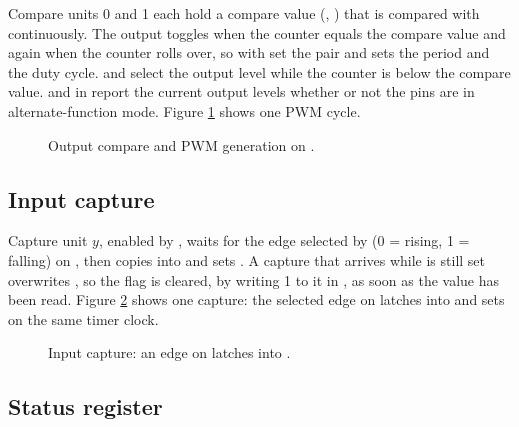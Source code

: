 Compare units 0 and 1 each hold a compare value (, ) that is compared with  continuously. The output  toggles when the counter equals the compare value and again when the counter rolls over, so with  set the pair  and  sets the period and the duty cycle.  and  select the output level while the counter is below the compare value.  and  in  report the current output levels whether or not the pins are in alternate-function mode. Figure \ref{fig:timer-output-compare-operation} shows one PWM cycle.

\begin{figure}[htpb]
	\centering
	
	\caption{Output compare and PWM generation on .}
	\label{fig:timer-output-compare-operation}
\end{figure}

\subsection{Input capture}

Capture unit $y$, enabled by , waits for the edge selected by  (0 = rising, 1 = falling) on , then copies  into  and sets . A capture that arrives while  is still set overwrites , so the flag is cleared, by writing 1 to it in , as soon as the value has been read. Figure \ref{fig:timer-capture} shows one capture: the selected edge on  latches  into  and sets  on the same timer clock.

\begin{figure}[htpb]
	\centering
	
	\caption{Input capture: an edge on  latches  into .}
	\label{fig:timer-capture}
\end{figure}

\subsection{Status register}

